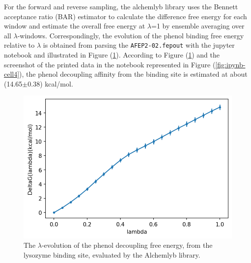 \documentclass[9pt,tutorial]{livecoms}
\begin{document}
For the forward and reverse sampling, the alchemlyb library uses the Bennett acceptance ratio (BAR) estimator to calculate the difference free energy for each window and estimate the overall free energy at {$\lambda$}=1 by ensemble averaging over all {$\lambda$}-windows. Correspondingly, the evolution of the phenol binding free energy relative to {$\lambda$} is obtained from parsing the \texttt{AFEP2-02.fepout} with the jupyter notebook and illustrated in Figure (\ref{fig:AFEP-decoupling1}). According to Figure (\ref{fig:AFEP-decoupling1}) and the screenshot of the printed data in the notebook represented in Figure (\ref{fig:ipynb-cell4}), the phenol decoupling affinity from the binding site is estimated at about (14.65$\pm$0.38) kcal/mol.

\begin{figure}[th!]
\centering
\includegraphics[width=0.8\linewidth]{Supp-Files/AFEP-Bound-Decoupling/output/Alchemlyb/output_9_1.png}
\caption{The {$\lambda$}-evolution of the phenol decoupling free energy, from the lysozyme binding site, evaluated by the Alchemlyb library.}\label{fig:AFEP-decoupling1}
\end{figure}
\end{document}
